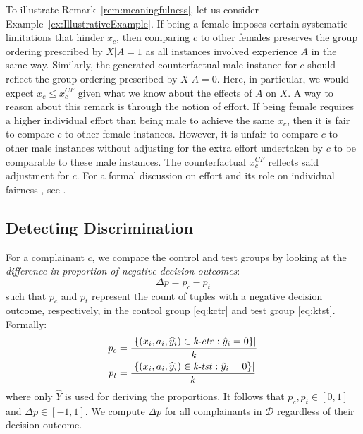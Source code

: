 To illustrate Remark~\ref{rem:meaningfulness}, let us consider Example~\ref{ex:IllustrativeExample}.
If being a female imposes certain systematic limitations that hinder $x_c$, then comparing $c$ to other females preserves the group ordering prescribed by $X|A=1$ as all instances involved experience $A$ in the same way.
Similarly, the generated counterfactual male instance for $c$ should reflect the group ordering prescribed by $X|A=0$. 
Here, in particular, we would expect $x_c \leq x_c^{CF}$ given what we know about the effects of $A$ on $X$.
A way to reason about this remark is through the notion of effort. 
If being female requires a higher individual effort than being male to achieve the same $x_c$, then it is fair to compare $c$ to other female instances. 
However, it is unfair to compare $c$ to other male instances without adjusting for the extra effort undertaken by $c$ to be comparable to these male instances. 
The counterfactual $x_c^{CF}$ reflects said adjustment for $c$.
For a formal discussion on effort and its role on individual fairness \parencite{DworkHPRZ12}, see \textcite{Chzhen2020WassersteinBarycenters, Chzhen2022MiniMax}.

\subsection{Detecting Discrimination}
\label{sec:CST_Disc}

For a complainant $c$, we compare the control and test groups by looking at the \textit{difference in proportion of negative decision outcomes}:
%
\begin{equation}
\label{eq:delta}
    \Delta p = p_c - p_t
\end{equation}
%
such that $p_c$ and $p_t$ represent the count of tuples with a negative decision outcome, respectively, in the control group \eqref{eq:kctr} and test group \eqref{eq:ktst}. Formally:
%
\begin{equation}
\label{eq:p1_and_p2}
\begin{aligned}
    p_c & = \frac{|\{ (x_i, a_i, \widehat{y}_i) \in \text{\textit{k-ctr}}: \hat{y}_i = 0 \}|}{k} \\
    p_t & = \frac{|\{ (x_i, a_i, \widehat{y}_i) \in \text{\textit{k-tst}}: \hat{y}_i = 0 \}|}{k}
\end{aligned}
\end{equation}
% 
where only $\hat{Y}$ is used for deriving the proportions.
It follows that $p_c, p_t \in [0, 1]$ and $\Delta p \in [-1, 1]$.
We compute $\Delta p$ for all complainants in $\mathcal{D}$ regardless of their decision outcome.

